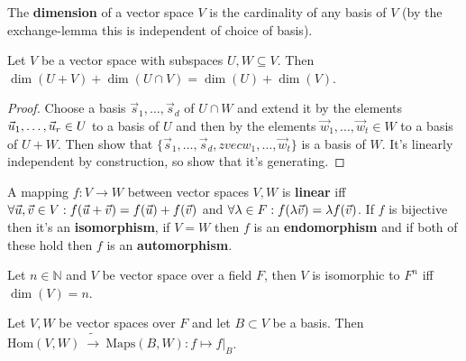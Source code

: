 \begin{multicols}{2}
\begin{definition}
The \textbf{dimension} of a vector space $V$ is the cardinality of any basis of $V$ (by the exchange-lemma this is independent of choice of basis).
\end{definition}

\begin{theorem}
Let $V$ be a vector space with subspaces $U, W\subseteq V$. Then $\dim(U+V) + \dim(U\cap V) = \dim(U)+\dim(V)$.
\end{theorem}
\begin{proof}
Choose a basis $\vec{s}_1,\dots,\vec{s}_d$ of $U\cap W$ and extend it by the elements $\vec{u}_1,\dots,\vec{u}_r\in U$ to a basis of $U$ and then by the elements $\vec{w}_1,\dots,\vec{w}_t\in W$ to a basis of $U + W$. Then show that $\{\vec{s}_1,\dots,\vec{s}_d,zvec{w}_1,\dots,\vec{w}_t\}$ is a basis of $W$. It's linearly independent by construction, so show that it's generating.
\end{proof}

\begin{definition}
A mapping $f:V\to W$ between vector spaces $V,W$ is \textbf{linear} iff $\forall\vec{u},\vec{v}\in V: f(\vec{u}+\vec{v})=f(\vec{u})+f(\vec{v})$ and $\forall\lambda\in F: f(\lambda\vec{v})=\lambda f(\vec{v})$. If $f$ is bijective then it's an \textbf{isomorphism}, if $V=W$ then $f$ is an \textbf{endomorphism} and if both of these hold then $f$ is an \textbf{automorphism}.
\end{definition}

\begin{theorem}
Let $n\in\mathbb{N}$ and $V$ be vector space over a field $F$, then $V$ is isomorphic to $F^n$ iff $\dim(V)=n$.
\end{theorem}

\begin{theorem}[1.7.8]
Let $V, W$ be vector spaces over $F$ and let $B\subset V$ be a basis. Then $\mathrm{Hom}(V,W)\ \tilde{\to}\ \mathrm{Maps}(B,W): f\mapsto f|_{B}$.
\end{theorem}


\end{multicols}
